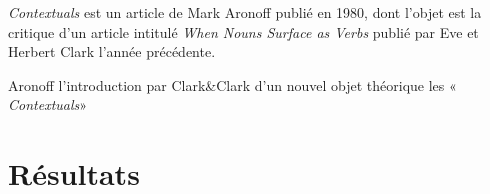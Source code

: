 \documentclass[a4paper,12pt]{article}
\author{Arthur Lapraye}
\begin{document}
 
 \maketitle
 
 \textit{Contextuals} est un article de Mark Aronoff publié en 1980, dont l'objet est la critique d'un article intitulé 
 \textit{When Nouns Surface as Verbs} publié par Eve et Herbert Clark l'année précédente. 
 
 Aronoff l'introduction par Clark&Clark d'un nouvel objet théorique les « \textit{Contextuals}»
 
 

 \section*{Résultats}
 
  
 
\end{document}
